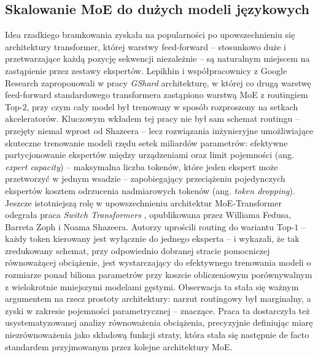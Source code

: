 \subsection{Skalowanie MoE do dużych modeli językowych}
\label{sec:moe_skalowanie}
Idea rzadkiego bramkowania zyskała na popularności po upowszechnieniu się architektury transformer, której warstwy feed-forward -- stosunkowo duże i przetwarzające każdą pozycję sekwencji niezależnie -- są naturalnym miejscem na zastąpienie przez zestawy ekspertów. Lepikhin i współpracownicy z Google Research zaproponowali w pracy \textit{GShard} \cite{lepikhin_2021_gshard_scaling_giant_models} architekturę, w której co drugą warstwę feed-forward standardowego transformera zastąpiono warstwą MoE z routingiem Top-$2$, przy czym cały model był trenowany w sposób rozproszony na setkach akceleratorów. Kluczowym wkładem tej pracy nie był sam schemat routingu -- przejęty niemal wprost od Shazeera \cite{shazeer_2017_sparsely_gated_mixture_of_experts} -- lecz rozwiązania inżynieryjne umożliwiające skuteczne trenowanie modeli rzędu setek miliardów parametrów: efektywne partycjonowanie ekspertów między urządzeniami oraz limit pojemności (ang. \textit{expert capacity}) -- maksymalna liczba tokenów, które jeden ekspert może przetworzyć w jednym wsadzie -- zapobiegający przeciążeniu pojedynczych ekspertów kosztem odrzucenia nadmiarowych tokenów (ang. \textit{token dropping}). \newline
Jeszcze istotniejszą rolę w upowszechnieniu architektur MoE-Transformer odegrała praca \textit{Switch Transformers} \cite{fedus_2021_switch_transformers}, opublikowana przez Williama Fedusa, Barreta Zoph i Noama Shazeera. Autorzy uprościli routing do wariantu Top-$1$ -- każdy token kierowany jest wyłącznie do jednego eksperta -- i wykazali, że tak zredukowany schemat, przy odpowiednio dobranej stracie pomocniczej równoważącej obciążenie, jest wystarczający do efektywnego trenowania modeli o rozmiarze ponad biliona parametrów przy koszcie obliczeniowym porównywalnym z wielokrotnie mniejszymi modelami gęstymi. Obserwacja ta stała się ważnym argumentem na rzecz prostoty architektury: narzut routingowy był marginalny, a zyski w zakresie pojemności parametrycznej -- znaczące. Praca ta dostarczyła też usystematyzowanej analizy równoważenia obciążenia, precyzyjnie definiując miarę niezrównoważenia jako składową funkcji straty, która stała się następnie de facto standardem przyjmowanym przez kolejne architektury MoE.
